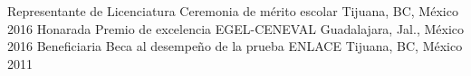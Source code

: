 \begin{cvhonors}
  \cvhonor
    {Representante de Licenciatura}
    {Ceremonia de mérito escolar}
    {Tijuana, BC, México}
    {2016}
  \cvhonor
    {Honarada}
    {Premio de excelencia EGEL-CENEVAL}
    {Guadalajara, Jal., México}
    {2016}
  \cvhonor
    {Beneficiaria}
    {Beca al desempeño de la prueba ENLACE}
    {Tijuana, BC, México}
    {2011}
\end{cvhonors}
